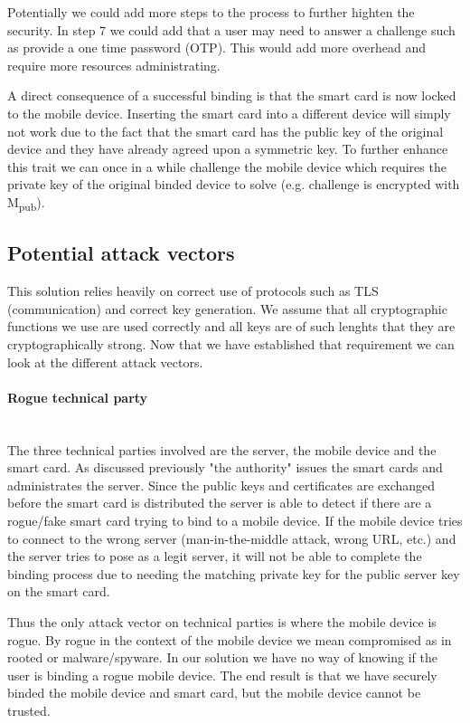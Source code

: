 Potentially we could add more steps to the process to further highten the security. In step 7 we could add that a user may need to answer a challenge such as provide a one time password (OTP). This would add more overhead and require more resources administrating.

A direct consequence of a successful binding is that the smart card is now locked to the mobile device. Inserting the smart card into a different device will simply not work due to the fact that the smart card has the public key of the original device and they have already agreed upon a symmetric key. To further enhance this trait we can once in a while challenge the mobile device which requires the private key of the original binded device to solve (e.g. challenge is encrypted with M\textsubscript{pub}).

\subsection{Potential attack vectors}
\label{sec:attackVectors}
This solution relies heavily on correct use of protocols such as TLS (communication) and correct key generation. We assume that all cryptographic functions we use are used correctly and all keys are of such lenghts that they are cryptographically strong. Now that we have established that requirement we can look at the different attack vectors.

\paragraph{Rogue technical party}\mbox{}\\
The three technical parties involved are the server, the mobile device and the smart card. As discussed previously "the authority" issues the smart cards and administrates the server. Since the public keys and certificates are exchanged before the smart card is distributed the server is able to detect if there are a rogue/fake smart card trying to bind to a mobile device. If the mobile device tries to connect to the wrong server (man-in-the-middle attack, wrong URL, etc.) and the server tries to pose as a legit server, it will not be able to complete the binding process due to needing the matching private key for the public server key on the smart card.

Thus the only attack vector on technical parties is where the mobile device is rogue. By rogue in the context of the mobile device we mean compromised as in rooted or malware/spyware. In our solution we have no way of knowing if the user is binding a rogue mobile device. The end result is that we have securely binded the mobile device and smart card, but the mobile device cannot be trusted.

